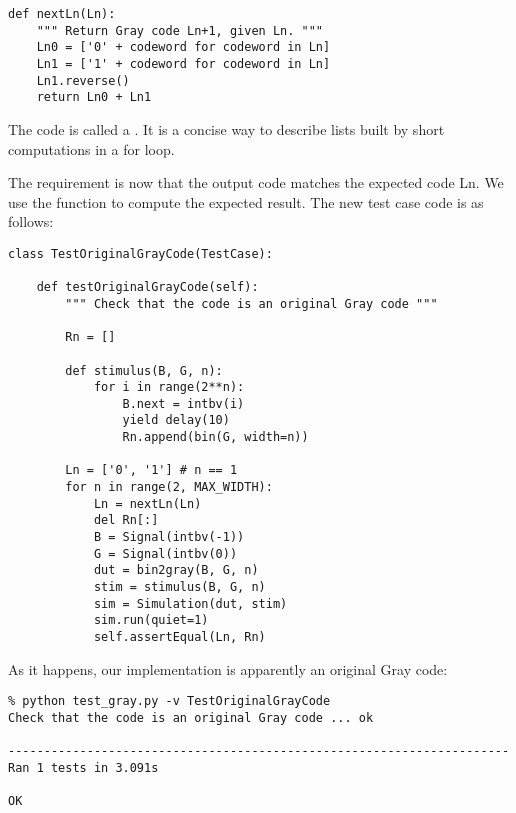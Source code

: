 \begin{verbatim}
def nextLn(Ln):
    """ Return Gray code Ln+1, given Ln. """
    Ln0 = ['0' + codeword for codeword in Ln]
    Ln1 = ['1' + codeword for codeword in Ln]
    Ln1.reverse()
    return Ln0 + Ln1
\end{verbatim}

The code  is called a . It is a concise way to describe lists built by short
computations in a for loop.

The requirement is now that the output code matches the
expected code Ln. We use the  function to compute the
expected result. The new test case code is as follows:

\begin{verbatim}
class TestOriginalGrayCode(TestCase):

    def testOriginalGrayCode(self):
        """ Check that the code is an original Gray code """

        Rn = []
        
        def stimulus(B, G, n):
            for i in range(2**n):
                B.next = intbv(i)
                yield delay(10)
                Rn.append(bin(G, width=n))
        
        Ln = ['0', '1'] # n == 1
        for n in range(2, MAX_WIDTH):
            Ln = nextLn(Ln)
            del Rn[:]
            B = Signal(intbv(-1))
            G = Signal(intbv(0))
            dut = bin2gray(B, G, n)
            stim = stimulus(B, G, n)
            sim = Simulation(dut, stim)
            sim.run(quiet=1)
            self.assertEqual(Ln, Rn)
\end{verbatim}

As it happens, our implementation is apparently an original Gray code:

\begin{verbatim}
% python test_gray.py -v TestOriginalGrayCode
Check that the code is an original Gray code ... ok

----------------------------------------------------------------------
Ran 1 tests in 3.091s

OK
\end{verbatim}


 

